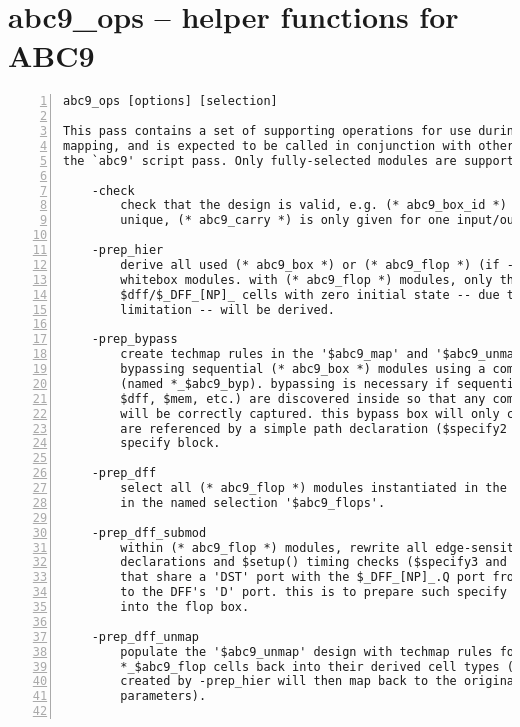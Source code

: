 \section{abc9\_ops -- helper functions for ABC9}
\label{cmd:abc9_ops}
\begin{lstlisting}[numbers=left,frame=single]
    abc9_ops [options] [selection]

This pass contains a set of supporting operations for use during ABC technology
mapping, and is expected to be called in conjunction with other operations from
the `abc9' script pass. Only fully-selected modules are supported.

    -check
        check that the design is valid, e.g. (* abc9_box_id *) values are
        unique, (* abc9_carry *) is only given for one input/output port, etc.

    -prep_hier
        derive all used (* abc9_box *) or (* abc9_flop *) (if -dff option)
        whitebox modules. with (* abc9_flop *) modules, only those containing
        $dff/$_DFF_[NP]_ cells with zero initial state -- due to an ABC
        limitation -- will be derived.

    -prep_bypass
        create techmap rules in the '$abc9_map' and '$abc9_unmap' designs for
        bypassing sequential (* abc9_box *) modules using a combinatorial box
        (named *_$abc9_byp). bypassing is necessary if sequential elements (e.g.
        $dff, $mem, etc.) are discovered inside so that any combinatorial paths
        will be correctly captured. this bypass box will only contain ports that
        are referenced by a simple path declaration ($specify2 cell) inside a
        specify block.

    -prep_dff
        select all (* abc9_flop *) modules instantiated in the design and store
        in the named selection '$abc9_flops'.

    -prep_dff_submod
        within (* abc9_flop *) modules, rewrite all edge-sensitive path
        declarations and $setup() timing checks ($specify3 and $specrule cells)
        that share a 'DST' port with the $_DFF_[NP]_.Q port from this 'Q' port
        to the DFF's 'D' port. this is to prepare such specify cells to be moved
        into the flop box.

    -prep_dff_unmap
        populate the '$abc9_unmap' design with techmap rules for mapping
        *_$abc9_flop cells back into their derived cell types (where the rules
        created by -prep_hier will then map back to the original cell with
        parameters).


\end{lstlisting}
